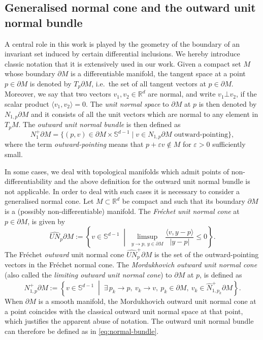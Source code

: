 \documentclass[reqno]{amsart}
\theoremstyle{definition}
\numberwithin{equation}{section}
\newcommand{\R}{\mathbb{R}}
\newcommand{\ep}{\varepsilon}
\begin{document}
\subsection{Generalised normal cone and the outward unit normal bundle}\label{sec:generalized-unit-normal-bundle}
A central role in this work is played by the geometry of the boundary of an invariant set induced by certain differential inclusions. We hereby introduce classic notation that it is extensively used in our work. Given a compact set $M$ whose boundary $\partial M$ is a differentiable manifold,  the tangent space at a point $p\in \partial M$ is denoted by $T_p\partial M$, i.e.~the set of all tangent vectors at $p\in \partial M$. Moreover, we say that two vectors $v_1,v_2\in\R^d$ are normal, and write $v_1\bot v_2$, if the scalar product $\langle v_1, v_2\rangle=0$. The \emph{unit normal space} to $\partial M$ at $p$ is then denoted by $N_{1,p}\partial M$ and it consists of all the unit vectors which are normal to any element in $T_pM$. The \emph{outward unit normal bundle} is then defined as 
\begin{equation}\label{eq:normal-bundle}
N^+_1\partial M=\big\{(p,v)\in \partial M\times \mathbb{S}^{d-1}\mid v\in N_{1,p}\partial M \text{ outward-pointing}\big\},
\end{equation}
where the term \emph{outward-pointing} means that $p+\ep v\notin M$ for $\ep>0$ sufficiently small.

In some cases, we deal with topological manifolds which admit points of non-differentiability and the above definition for the outward unit normal bundle is not applicable. In order to deal with such cases it is necessary to consider a generalised normal cone. Let \( M \subset \mathbb{R}^d \) be compact and such that its boundary $\partial M$ is a (possibly non-differentiable) manifold. The \emph{Fréchet unit normal cone} at \( p\in \partial M \), is given by
\[
\widehat{UN}_p\partial M := \left\{ v \in \mathbb{S}^{d-1} \;\middle|\; \limsup_{y \to p,\, y \in \partial M} \frac{\langle v, y - p \rangle}{|y - p|} \leq 0 \right\}.
\]
The Fréchet \emph{outward} unit normal cone $\widehat {UN}^+_p\partial M$ is the set  of the outward-pointing vectors in the Fréchet normal cone. The \emph{Mordukhovich  outward unit normal cone} (also called the \emph{limiting  outward unit normal cone}) to \( \partial M \) at \( p \), is defined as
\[
N^+_{1,p}\partial M := \left\{ v \in \mathbb{S}^{d-1} \;\middle|\; \exists\, p_k \to p,\ v_k \to v,\ p_k \in \partial M,\ v_k \in \widehat{N}^+_{1,p_k}\partial M \right\}.
\]
When $\partial M$ is a smooth manifold, the Mordukhovich outward unit normal cone at a point coincides with the classical outward unit  normal space at that point, which justifies the apparent abuse of notation.
The outward unit normal bundle can therefore be defined as in \eqref{eq:normal-bundle}. 
\end{document}
